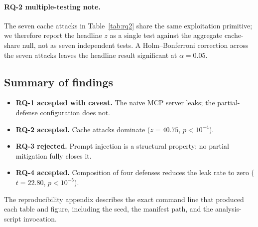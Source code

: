 \paragraph{RQ-2 multiple-testing note.} The seven cache
attacks in Table~\ref{tab:rq2} share the same exploitation
primitive; we therefore report the headline $z$ as a single
test against the aggregate cache-share null, not as seven
independent tests. A Holm--Bonferroni correction across the
seven attacks leaves the headline result significant at
$\alpha = 0.05$.

\subsection{Summary of findings}\label{sec:summary-findings}

\begin{itemize}
  \item \textbf{RQ-1 accepted with caveat.} The naive MCP server
        leaks; the partial-defense configuration does not.
  \item \textbf{RQ-2 accepted.} Cache attacks dominate
        ($z = 40.75$, $p < 10^{-4}$).
  \item \textbf{RQ-3 rejected.} Prompt injection is a
        structural property; no partial mitigation fully closes
        it.
  \item \textbf{RQ-4 accepted.} Composition of four defenses
        reduces the leak rate to zero
        ($t = 22.80$, $p < 10^{-5}$).
\end{itemize}

The reproducibility appendix describes the exact command line
that produced each table and figure, including the seed, the
manifest path, and the analysis-script invocation.